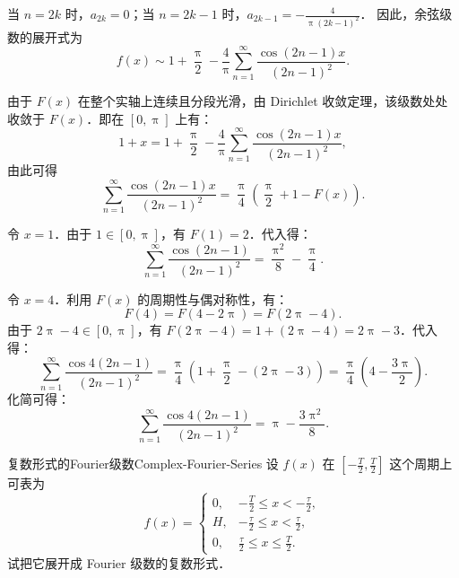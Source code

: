 \begin{solution}
    当 $n = 2k$ 时，$a_{2k} = 0$；当 $n = 2k-1$ 时，$a_{2k-1} = -\frac{4}{\uppi (2k-1)^2}$．
    因此，余弦级数的展开式为
    \begin{equation}
        \boxed{f(x) \sim 1 + \frac{\uppi}{2} - \frac{4}{\uppi} \sum_{n=1}^{\infty} \frac{\cos(2n-1)x}{(2n-1)^2}}.
    \end{equation}

    由于 $F(x)$ 在整个实轴上连续且分段光滑，由 Dirichlet 收敛定理，该级数处处收敛于 $F(x)$．即在 $[0, \uppi]$ 上有：
    \begin{equation}
        1 + x = 1 + \frac{\uppi}{2} - \frac{4}{\uppi} \sum_{n=1}^{\infty} \frac{\cos(2n-1)x}{(2n-1)^2},
    \end{equation}
    由此可得
    \begin{equation}
        \label{eq:sum-formula}
        \sum_{n=1}^{\infty} \frac{\cos(2n-1)x}{(2n-1)^2} = \frac{\uppi}{4} \left( \frac{\uppi}{2} + 1 - F(x) \right).
    \end{equation}


    令 $x=1$．由于 $1 \in [0, \uppi]$，有 $F(1) = 2$．代入得：
    \begin{equation}
        \boxed{\sum_{n=1}^{\infty} \frac{\cos(2n - 1)}{(2n - 1)^2} = \frac{\uppi^2}{8} - \frac{\uppi}{4}}.
    \end{equation}


    令 $x=4$．利用 $F(x)$ 的周期性与偶对称性，有：
    \begin{equation}
        F(4) = F(4 - 2\uppi) = F(2\uppi - 4).
    \end{equation}
    由于 $2\uppi - 4 \in [0, \uppi]$，有 $F(2\uppi - 4) = 1 + (2\uppi - 4) = 2\uppi - 3$．代入得：
    \begin{equation}
        \sum_{n=1}^{\infty} \frac{\cos 4(2n - 1)}{(2n - 1)^2} = \frac{\uppi}{4} \left( 1 + \frac{\uppi}{2} - (2\uppi - 3) \right) = \frac{\uppi}{4} \left( 4 - \frac{3\uppi}{2} \right).
    \end{equation}
    化简可得：
    \begin{equation}
        \boxed{\sum_{n=1}^{\infty} \frac{\cos 4(2n - 1)}{(2n - 1)^2} = \uppi - \frac{3\uppi^2}{8}}.
    \end{equation}
\end{solution}

\begin{problem}{复数形式的Fourier级数}{Complex-Fourier-Series}
    设 $f(x)$ 在 $\left[-\frac{T}{2}, \frac{T}{2}\right]$ 这个周期上可表为
    \begin{equation}
        f(x) = \begin{cases} 0, & -\frac{T}{2} \leqslant x < -\frac{\tau}{2}, \\ H, & -\frac{\tau}{2} \leqslant x < \frac{\tau}{2}, \\ 0, & \frac{\tau}{2} \leqslant x \leqslant \frac{T}{2}. \end{cases}
    \end{equation}
    试把它展开成 Fourier 级数的复数形式．
\end{problem}

